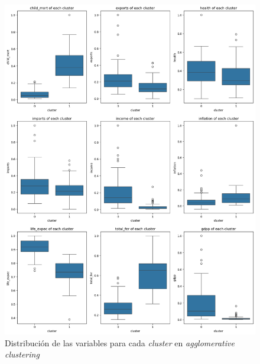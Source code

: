 \documentclass{article}
\begin{document}
\begin{figure}[H]
  \centering
  \includegraphics[width=\linewidth]{../images/agglomerative/features-dist.png}
  \caption{Distribución de las variables para cada \textit{cluster} en \textit{agglomerative clustering}}
  \label{fig:agglomerative-features}
\end{figure}
\end{document}

